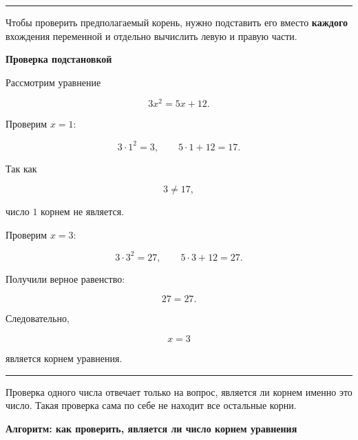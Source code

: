 \documentclass[a4paper,12pt]{article}
\newcommand{\subsectiontitle}[1]{%
    \vspace{0.55em}%
    {\large\bfseries\color{darkaccent}#1\par}%
    \vspace{0.25em}%
}
\newcommand{\important}[1]{%
    \par\vspace{0.3em}%
    \noindent
    \begin{minipage}{\linewidth}
        {\color{accent}\rule{2.2pt}{\baselineskip}}\hspace{0.6em}%
        \begin{minipage}[t]{0.94\linewidth}
            #1
        \end{minipage}
    \end{minipage}%
    \par\vspace{0.3em}%
}
\begin{document}
\important{
Чтобы проверить предполагаемый корень, нужно подставить его вместо
\textbf{каждого} вхождения переменной и отдельно вычислить левую и правую части.
}

\subsectiontitle{Проверка подстановкой}

Рассмотрим уравнение

\[
3x^2=5x+12.
\]

Проверим \(x=1\):

\[
3\cdot1^2=3,
\qquad
5\cdot1+12=17.
\]

Так как

\[
3\ne17,
\]

число \(1\) корнем не является.

Проверим \(x=3\):

\[
3\cdot3^2=27,
\qquad
5\cdot3+12=27.
\]

Получили верное равенство:

\[
27=27.
\]

Следовательно,

\[
\boxed{x=3}
\]

является корнем уравнения.

\important{
Проверка одного числа отвечает только на вопрос, является ли корнем
именно это число. Такая проверка сама по себе не находит все остальные корни.
}

\clearpage
\thispagestyle{plain}

\begin{center}
{\Large\bfseries\color{darkaccent}
Алгоритм: как проверить, является ли число корнем уравнения}
\end{center}

\vspace{0.8cm}
\end{document}
